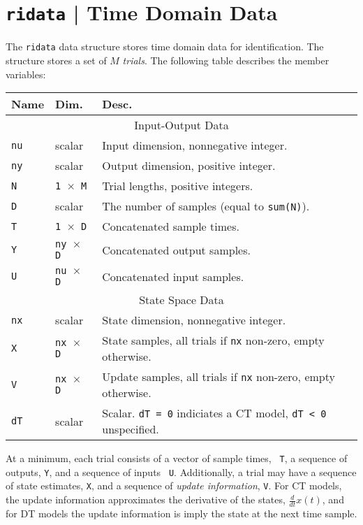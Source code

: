 \documentclass{article}
\begin{document}
\section{{\tt ridata} | Time Domain Data}
The {\tt ridata} data structure stores time domain data for
identification.  The structure stores a set of $M$ {\it trials}.  The
following table describes the member variables:

\begin{center}
  \begin{tabular}{|l|l|l|}
    \hline
    Name & Dim. & Desc.\\
    \hline
    \multicolumn{3}{|c|}{Input-Output Data}\\
    \hline
    {\tt nu} & scalar & Input dimension, nonnegative integer.\\
    {\tt ny} & scalar & Output dimension, positive integer.\\
   {\tt N} & {\tt 1 $\times$ M} & Trial lengths, positive integers. \\
    {\tt D} & scalar & The number of samples (equal to {\tt sum(N)}).\\
    {\tt T} & {\tt 1 $\times$ D} & Concatenated sample
    times. \\
    {\tt Y} & {\tt ny $\times$ D} & Concatenated  output samples. \\
  {\tt U} & {\tt nu $\times$ D} &Concatenated input samples.\\
\hline
  \multicolumn{3}{|c|}{State Space Data}\\
  \hline
  {\tt nx} & scalar & State dimension, nonnegative integer.\\
 {\tt X} & {\tt nx $\times$ D} & State
  samples, all trials if {\tt nx} non-zero, empty otherwise.\\
  {\tt V} & {\tt nx $\times$ D} & Update
  samples, all trials if {\tt nx} non-zero, empty otherwise.\\
  {\tt dT} & scalar & Scalar.  {\tt dT = 0}
  indiciates a CT model, {\tt dT < 0} unspecified.\\
\hline
 \end{tabular}
\end{center}
At a minimum, each trial consists of a vector of sample times, {\tt
  T}, a sequence of outputs, {\tt Y}, and a sequence of inputs {\tt
  U}.  Additionally, a trial may have a sequence of state estimates,
{\tt X}, and a sequence of {\it update information}, {\tt V}.  For CT
models, the update information approximates the derivative of the
states, $\frac{d}{dt} x(t)$, and for DT models the update information
is imply the state at the next time sample.
\end{document}
